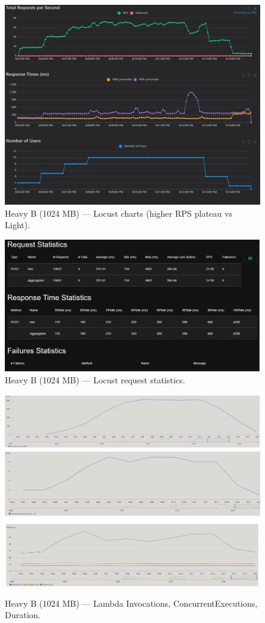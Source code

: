 \documentclass[11pt,a4paper]{article}
\begin{document}
\begin{figure}[h!] \centering
  \includegraphics[width=\linewidth]{"figures/hB - Charts.png"}
  \caption{Heavy B (1024 MB) --- Locust charts (higher RPS plateau vs Light).}
\end{figure}

\begin{figure}[h!] \centering
  \includegraphics[width=\linewidth]{"figures/hB - Stats.png"}
  \caption{Heavy B (1024 MB) --- Locust request statistics.}
\end{figure}

\begin{figure}[h!] \centering
  \includegraphics[width=.32\linewidth]{"figures/hB - Invocations.png"}\hfill
  \includegraphics[width=.32\linewidth]{"figures/hB - ConcEx.png"}\hfill
  \includegraphics[width=.32\linewidth]{"figures/hB - Duration.png"}
  \caption{Heavy B (1024 MB) --- Lambda Invocations, ConcurrentExecutions, Duration.}
\end{figure}
\end{document}
